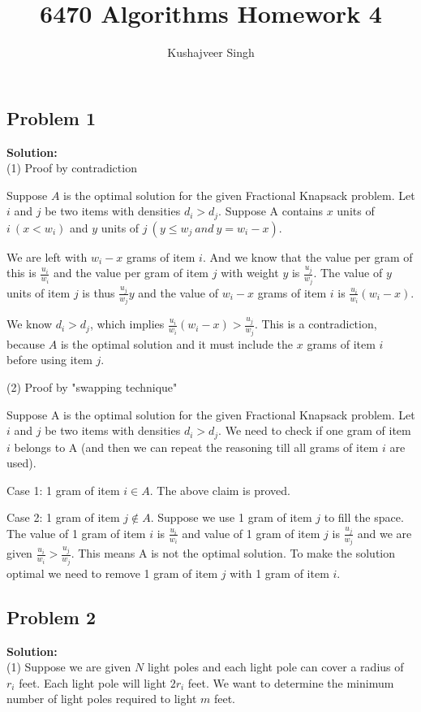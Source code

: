 \documentclass[12pt,a4paper]{article}
\title{6470 Algorithms Homework 4}
\author{Kushajveer Singh}
\date{}
\newcommand{\solution}{\noindent\textbf{Solution:}\\\indent}
\begin{document}
\maketitle

\subsection*{Problem 1}
\solution
(1) Proof by contradiction

Suppose $A$ is the optimal solution for the given Fractional Knapsack problem. Let $i$ and $j$ be two items with densities $d_i > d_j$. Suppose A contains $x$ units of $i\ (x < w_i)$ and $y$ units of $j\ (y \leq w_j\ and\ y = w_i - x)$.

We are left with $w_i - x$ grams of item $i$. And we know that the value per gram of this is $\frac{u_i}{w_i}$ and the value per gram of item $j$ with weight $y$ is $\frac{u_j}{w_j}$. The value of $y$ units of item $j$ is thus $\frac{u_j}{w_j}y$ and the value of $w_i-x$ grams of item $i$ is $\frac{u_i}{w_i}(w_i-x)$. 


We know $d_i > d_j$, which implies $\frac{u_i}{w_i}(w_i-x) > \frac{u_j}{w_j}$. This is a contradiction, because $A$ is the optimal solution and it must include the $x$ grams of item $i$ before using item $j$.

(2) Proof by "swapping technique"

Suppose A is the optimal solution for the given Fractional Knapsack problem. Let $i$ and $j$ be two items with densities $d_i > d_j$. We need to check if one gram of item $i$ belongs to A (and then we can repeat the reasoning till all grams of item $i$ are used).

Case 1: 1 gram of item $i \in A$. The above claim is proved.

Case 2: 1 gram of item $j \not\in A$. Suppose we use 1 gram of item $j$ to fill the space. The value of 1 gram of item $i$ is $\frac{u_i}{w_i}$ and value of 1 gram of item $j$ is $\frac{u_j}{w_j}$ and we are given $\frac{u_i}{w_i} > \frac{u_j}{w_j}$. This means A is not the optimal solution. To make the solution optimal we need to remove 1 gram of item $j$ with 1 gram of item $i$.

\subsection*{Problem 2}
\solution
(1) Suppose we are given $N$ light poles and each light pole can cover a radius of $r_i$ feet. Each light pole will light $2r_i$ feet. We want to determine the minimum number of light poles required to light $m$ feet.
\end{document}
